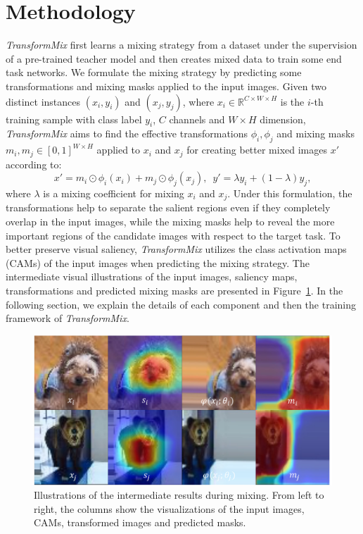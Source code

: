 \documentclass[10pt]{article} %
\newcommand{\TMIX}[0]{\textit{TransformMix }}
\newcommand{\TMIXb}[0]{\textit{TransformMix}}
\begin{document}
\section{Methodology} \label{sec:method}
\noindent \TMIX first learns a mixing strategy from a dataset under the supervision of a pre-trained teacher model and then creates mixed data to train some end task networks. We formulate the mixing strategy by predicting some transformations and mixing masks applied to the input images. Given two distinct instances $(x_i, y_i)$ and $(x_j, y_j)$, where $x_i\in \mathbb{R}^{C\times W \times H}$ is the $i$-th training sample with class label $y_i$, $C$ channels and $W \times H$ dimension, \TMIX aims to find the 
effective transformations $\phi_i, \phi_j$ and mixing masks $m_i, m_j \in [0,1]^{W \times H}$ applied to $x_i$ and $x_j$ for creating better mixed images $x'$ according to:
\begin{equation} \label{eq:general}
	x' = m_i \odot \phi_i(x_i) + m_j \odot \phi_j(x_j), \,\,\,
	y' = \lambda y_i + (1-\lambda)y_j,
\end{equation}
where $\lambda$ is a mixing coefficient for mixing $x_i$ and $x_j$. Under this formulation, the transformations help to separate the salient regions even if they completely overlap in the input images, while the mixing masks help to reveal the more important regions of the candidate images with respect to the target task. To better preserve visual saliency, \TMIX utilizes the class activation maps (CAMs) of the input images when predicting the mixing strategy. The intermediate visual illustrations of the input images, saliency maps, transformations and predicted mixing masks are presented in Figure~\ref{fig:test1}. In the following section, we explain the details of each component and then the training framework of \TMIXb.

\begin{figure}[h]
  \centering
  \includegraphics[width=0.6\linewidth]{./img/process}
  \caption{Illustrations of the intermediate results during mixing. From left to right, the columns show the visualizations of the input images, CAMs, transformed images and predicted masks.}
  \label{fig:test1}
\end{figure}
\end{document}
